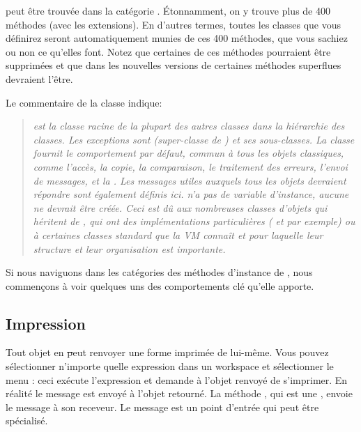 \documentclass[a4paper,10pt,twoside]{book}
\begin{document}
 peut \^etre trouv\'ee dans la cat\'egorie . \'Etonnamment, on y trouve plus de 400 m\'ethodes (avec les extensions). En d'autres termes, toutes les classes que vous d\'efinirez seront automatiquement munies de ces 400 m\'ethodes, que vous sachiez ou non ce qu'elles font. Notez que certaines de ces m\'ethodes pourraient \^etre supprim\'ees et que dans les nouvelles versions de \sq certaines m\'ethodes superflues devraient l'\^etre.

Le commentaire de la classe  indique:
\begin{quote}
\textit{ est la classe racine de la plupart des autres classes dans la hi\'erarchie des classes. Les exceptions sont  (super-classe de ) et ses sous-classes.
La classe  fournit le comportement par d\'efaut, commun \`a tous les objets classiques, comme l'acc\`es, la copie, la comparaison, le traitement des erreurs, l'envoi de messages, et la . Les messages utiles auxquels tous les objets devraient r\'epondre sont \'egalement d\'efinis ici.
 n'a pas de variable d'instance, aucune ne devrait \^etre cr\'e\'ee. Ceci est d\^u aux nombreuses classes d'objets qui h\'eritent de , qui ont des impl\'ementations particuli\`eres ( et  par exemple) ou \`a certaines classes standard que la VM conna\^it et pour laquelle leur structure et leur organisation est importante.}
\end{quote}

Si nous naviguons dans les cat\'egories des m\'ethodes d'instance de , nous commen\c{c}ons \`a voir quelques uns des comportements cl\'e qu'elle apporte.

\subsection{Impression}
Tout objet en \st peut renvoyer une forme imprim\'ee de lui-m\^eme. Vous pouvez s\'electionner n'importe quelle expression dans un workspace et s\'electionner le menu : ceci ex\'ecute l'expression et demande \`a l'objet renvoy\'e de s'imprimer. En r\'ealit\'e le message  est envoy\'e \`a l'objet retourn\'e. La m\'ethode , qui est une , envoie le message  \`a son receveur. Le message  est un point d'entr\'ee qui peut \^etre sp\'ecialis\'e. 
\end{document}
